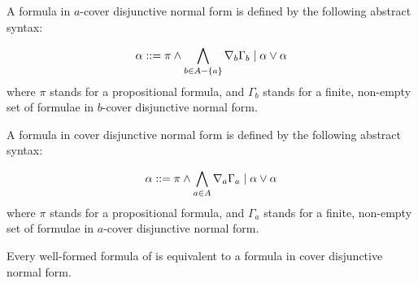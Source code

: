 \begin{definition}\label{kd45-cdnf}
A formula in $a$-cover disjunctive normal form is defined by the following
abstract syntax:

$$
\alpha ::= \pi \land \bigwedge_{b \in A - \{a\}} \nabla_b \Gamma_b \mid
\alpha \lor \alpha
$$
where $\pi$ stands for a propositional formula, and $\Gamma_b$ stands for a
finite, non-empty set of formulae in $b$-cover disjunctive normal form.

A formula in cover disjunctive normal form is defined by the following abstract
syntax:

$$
\alpha ::= \pi \land \bigwedge_{a \in A} \nabla_a \Gamma_a \mid
\alpha \lor \alpha
$$
where $\pi$ stands for a propositional formula, and $\Gamma_a$ stands for a
finite, non-empty set of formulae in $a$-cover disjunctive normal form.
\end{definition}

\begin{lemma}
Every well-formed formula of \logicKD{} is equivalent to a formula in
cover disjunctive normal form.
\end{lemma}

